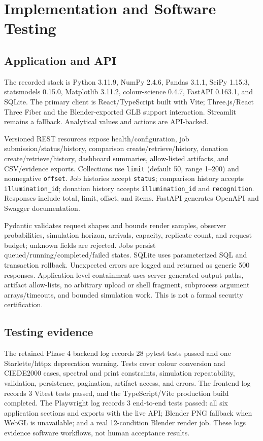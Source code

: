 \documentclass[journal]{IEEEtran}
\begin{document}
\section{Implementation and Software Testing}
\subsection{Application and API}
The recorded stack is Python 3.11.9, NumPy 2.4.6, Pandas 3.1.1, SciPy 1.15.3, statsmodels 0.15.0, Matplotlib 3.11.2, colour-science 0.4.7, FastAPI 0.163.1, and SQLite. The primary client is React/TypeScript built with Vite; Three.js/React Three Fiber and the Blender-exported GLB support interaction. Streamlit remains a fallback. Analytical values and actions are API-backed.

Versioned REST resources expose health/configuration, job submission/status/history, comparison create/retrieve/history, donation create/retrieve/history, dashboard summaries, allow-listed artifacts, and CSV/evidence exports. Collections use \texttt{limit} (default 50, range 1--200) and nonnegative \texttt{offset}. Job histories accept \texttt{status}; comparison history accepts \texttt{illumination\_id}; donation history accepts \texttt{illumination\_id} and \texttt{recognition}. Responses include total, limit, offset, and items. FastAPI generates OpenAPI and Swagger documentation.

Pydantic validates request shapes and bounds render samples, observer probabilities, simulation horizon, arrivals, capacity, replicate count, and request budget; unknown fields are rejected. Jobs persist queued/running/completed/failed states. SQLite uses parameterized SQL and transaction rollback. Unexpected errors are logged and returned as generic 500 responses. Application-level containment uses server-generated output paths, artifact allow-lists, no arbitrary upload or shell fragment, subprocess argument arrays/timeouts, and bounded simulation work. This is not a formal security certification.

\subsection{Testing evidence}
The retained Phase 4 backend log records 28 pytest tests passed and one Starlette/httpx deprecation warning. Tests cover colour conversion and CIEDE2000 cases, spectral and print constraints, simulation repeatability, validation, persistence, pagination, artifact access, and errors. The frontend log records 3 Vitest tests passed, and the TypeScript/Vite production build completed. The Playwright log records 3 end-to-end tests passed: all six application sections and exports with the live API; Blender PNG fallback when WebGL is unavailable; and a real 12-condition Blender render job. These logs evidence software workflows, not human acceptance results.
\end{document}
